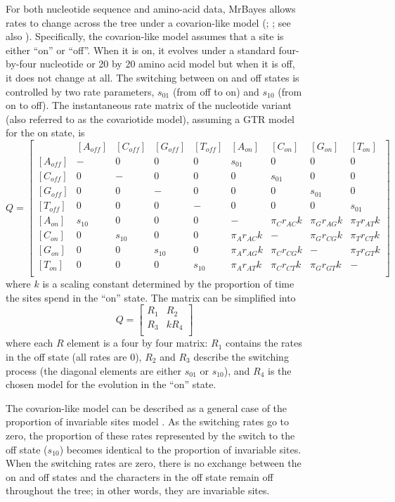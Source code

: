 \documentclass[12pt]{book}
\begin{document}
\begin{figure}[h]
For both nucleotide sequence and amino-acid data, MrBayes allows rates to change across the tree
under a covarion-like model (\citet{tuffley98}; \citet{huelsenbeck02a}; see also
\citet{galtier01}). Specifically, the covarion-like model assumes that a site is either ``on'' or
``off''. When it is on, it evolves under a standard four-by-four nucleotide or 20 by 20 amino acid
model but when it is off, it does not change at all. The switching between on and off states is
controlled by two rate parameters, $s_{01}$ (from off to on) and $s_{10}$ (from on to off). The
instantaneous rate matrix of the nucleotide variant (also referred to as the covariotide model),
assuming a GTR model for the on state, is
\footnotesize
\[
Q=\begin{bmatrix}
    & [A_{off}] & [C_{off}] & [G_{off}] & [T_{off}] & [A_{on}] & [C_{on}] & [G_{on}] & [T_{on}]\\
 [A_{off}]& - & 0 & 0 & 0 & s_{01} & 0 & 0 & 0 \\
 [C_{off}]& 0 & - & 0 & 0 & 0 & s_{01} & 0 & 0 \\
 [G_{off}]& 0 & 0 & - & 0 & 0 & 0 & s_{01} & 0 \\
 [T_{off}]& 0 & 0 & 0 & - & 0 & 0 & 0 & s_{01} \\
 [A_{on}]& s_{10} & 0 & 0 & 0 & - & \pi_C r_{AC} k  & \pi_G r_{AG} k & \pi_T r_{AT} k  \\
 [C_{on}]& 0 & s_{10} & 0 & 0 & \pi_A r_{AC} k  & - & \pi_G r_{CG} k & \pi_T r_{CT} k  \\
 [G_{on}]& 0 & 0 & s_{10} & 0 & \pi_A r_{AG} k  & \pi_C r_{CG} k & - & \pi_T r_{GT} k  \\
 [T_{on}]& 0 & 0 & 0 & s_{10} & \pi_A r_{AT} k  & \pi_C r_{CT} k &  \pi_G r_{GT} k &-  \\
\end{bmatrix}
\]
\normalsize
where $k$ is a scaling constant determined by the proportion of time the sites spend in the ``on''
state. The matrix can be simplified into
\[
Q=\begin{bmatrix}
  R_1 & R_2\\
  R_3 & k R_4\\
\end{bmatrix}
\]
where each $R$ element is a four by four matrix: $R_1$ contains the rates in the off state (all
rates are 0), $R_2$ and $R_3$ describe the switching process (the diagonal elements are either
$s_{01}$ or $s_{10}$), and $R_4$ is the chosen model for the evolution in the ``on'' state.

The covarion-like model can be described as a general case of the proportion of invariable sites
model \citep{huelsenbeck02a}. As the switching rates go to zero, the proportion of these rates
represented by the switch to the off state ($s_{10}$) becomes identical to the proportion of
invariable sites. When the switching rates are zero, there is no exchange between the on and off
states and the characters in the off state remain off throughout the tree; in other words, they are
invariable sites.


\end{figure}
\end{document}
